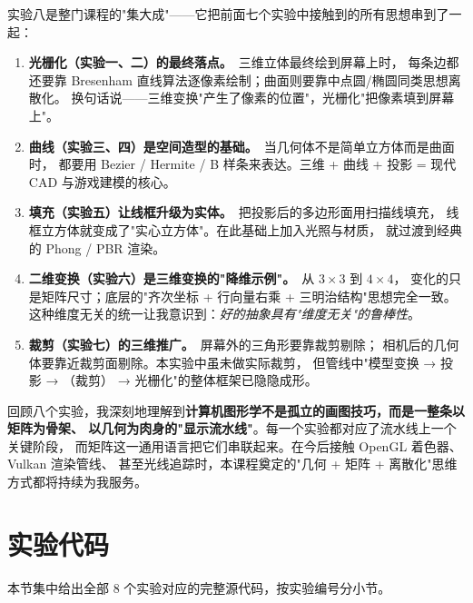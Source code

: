 \documentclass[a4paper,12pt]{ctexart}
\begin{document}
实验八是整门课程的"集大成"——它把前面七个实验中接触到的所有思想串到了一起：

\begin{enumerate}[leftmargin=2em,itemsep=0.2em]
    \item \textbf{光栅化（实验一、二）的最终落点。}\ 三维立体最终绘到屏幕上时，
        每条边都还要靠 Bresenham 直线算法逐像素绘制；曲面则要靠中点圆/椭圆同类思想离散化。
        换句话说——三维变换"产生了像素的位置"，光栅化"把像素填到屏幕上"。

    \item \textbf{曲线（实验三、四）是空间造型的基础。}\ 当几何体不是简单立方体而是曲面时，
        都要用 Bezier / Hermite / B 样条来表达。三维 + 曲线 + 投影 = 现代 CAD 与游戏建模的核心。

    \item \textbf{填充（实验五）让线框升级为实体。}\ 把投影后的多边形面用扫描线填充，
        线框立方体就变成了"实心立方体"。在此基础上加入光照与材质，
        就过渡到经典的 Phong / PBR 渲染。

    \item \textbf{二维变换（实验六）是三维变换的"降维示例"。}\ 从 $3\times 3$ 到 $4\times 4$，
        变化的只是矩阵尺寸；底层的"齐次坐标 + 行向量右乘 + 三明治结构"思想完全一致。
        这种维度无关的统一让我意识到：\emph{好的抽象具有"维度无关"的鲁棒性}。

    \item \textbf{裁剪（实验七）的三维推广。}\ 屏幕外的三角形要靠裁剪剔除；
        相机后的几何体要靠近裁剪面剔除。本实验中虽未做实际裁剪，
        但管线中"模型变换 → 投影 → （裁剪） → 光栅化"的整体框架已隐隐成形。
\end{enumerate}

回顾八个实验，我深刻地理解到\textbf{计算机图形学不是孤立的画图技巧，而是一整条以矩阵为骨架、
以几何为肉身的"显示流水线"}。每一个实验都对应了流水线上一个关键阶段，
而矩阵这一通用语言把它们串联起来。在今后接触 OpenGL 着色器、Vulkan 渲染管线、
甚至光线追踪时，本课程奠定的"几何 + 矩阵 + 离散化"思维方式都将持续为我服务。


\clearpage
\section{实验代码}

本节集中给出全部 8 个实验对应的完整源代码，按实验编号分小节。
\end{document}
